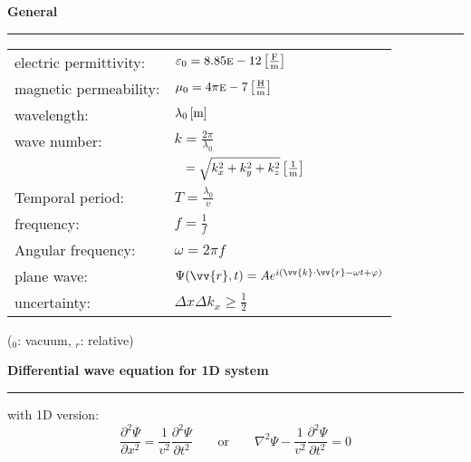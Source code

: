 
\vspace{2mm}
\normalsize\textbf{General}\small
\hrule
\vspace{2pt}
{
	\setlength{\extrarowheight}{4pt}
	\begin{tabular}{l l}
		electric permittivity: & $\varepsilon_0 = 8.85\textsc{e}-12 \unit[2]{\frac{F}{m}}$          \\
		magnetic permeability: & $\mu_0=4\pi\textsc{e}-7 \unit[2]{\frac{H}{m}}$                     \\
		wavelength:            & $\lambda_0 \unit[2]{m}$                                            \\
		wave number:           & $k=\frac{2\pi}{\lambda_0}$                                         \\
		                       & $\phantom{k } = \sqrt{k_x^2+k_y^2+k_z^2} \unit[2]{\frac{1}{m}}$    \\
		Temporal period:       & $T = \frac{\lambda_0}{v}$                                          \\
		frequency:             & $f= \frac{1}{f}$                                                   \\
		Angular frequency:     & $\omega = 2\pi f$                                                  \\
		plane wave:            & $\Psi(\vv{r},t) = Ae^{i(\vv{k}\cdot \vv{r} - \omega t + \varphi)}$ \\
		uncertainty:           & $\Delta x \Delta k_x \geq \frac{1}{2}$
	\end{tabular}\newline
}
($_0$: vacuum, $_r$: relative)

\vspace{2mm}
\normalsize\textbf{Differential wave equation for 1D system}\small
\hrule
\vspace{2pt}
with 1D version:
$$ \frac{\partial^2\Psi}{\partial x^2} = \frac{1}{v^2} \frac{\partial^2\Psi}{\partial t^2} \hspace{2em}\text{or}\hspace{2em} \nabla^2 \Psi - \frac{1}{v^2} \frac{\partial^2\Psi}{\partial t^2} = 0$$

